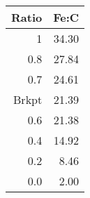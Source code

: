 \documentclass{article}
\begin{document}
\begin{table}[ht]
\centering
\begin{tabular}{rr}
  \hline
 Ratio & Fe:C \\ 
  \hline
1 & 34.30 \\ 
  0.8 & 27.84 \\ 
  0.7 & 24.61 \\ 
  Brkpt & 21.39 \\ 
  0.6 & 21.38 \\ 
  0.4 & 14.92 \\ 
  0.2 & 8.46 \\ 
  0.0 & 2.00 \\ 
   \hline
\end{tabular}
\end{table}
\end{document}
